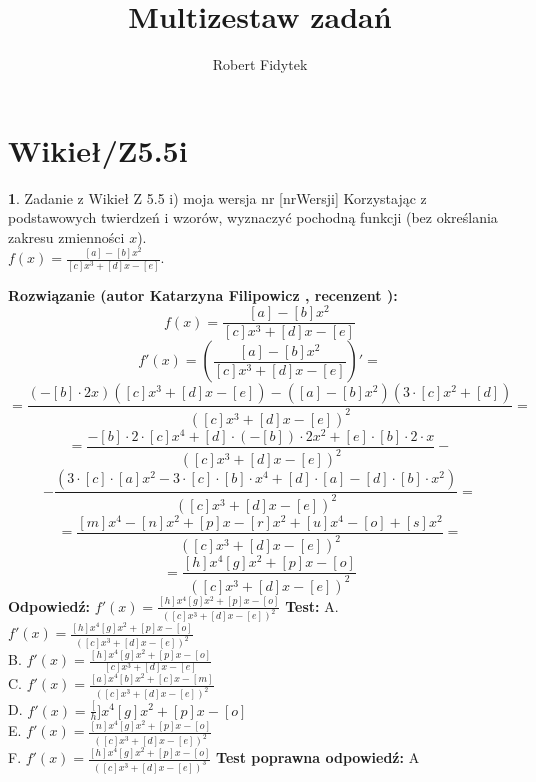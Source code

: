\documentclass[12pt, a4paper]{article}
\title{Multizestaw zadań}
\author{Robert Fidytek}
\date{}
\theoremstyle{definition} %
\newtheorem{zad}{}
\newcommand{\kategoria}[1]{\section{#1}} %
\newcommand{\zadStart}[1]{\begin{zad}#1\newline} %
\newcommand{\zadStop}{\end{zad}}   %
\newcommand{\rozwStart}[2]{\noindent \textbf{Rozwiązanie (autor #1 , recenzent #2): }\newline} %
\newcommand{\rozwStop}{\newline}                                            %
\newcommand{\odpStart}{\noindent \textbf{Odpowiedź:}\newline}    %
\newcommand{\odpStop}{\newline}                                             %
\newcommand{\testStart}{\noindent \textbf{Test:}\newline} %
\newcommand{\testStop}{\newline} %
\newcommand{\kluczStart}{\noindent \textbf{Test poprawna odpowiedź:}\newline} %
\newcommand{\kluczStop}{\newline} %
\begin{document}
\maketitle


\kategoria{Wikieł/Z5.5i}
\zadStart{Zadanie z Wikieł Z 5.5 i) moja wersja nr [nrWersji]}
Korzystając z podstawowych twierdzeń i wzorów, wyznaczyć pochodną funkcji (bez określania zakresu zmienności $x$).\\ $f(x)=\frac{[a]-[b]x^2}{[c]x^3+[d]x-[e]}$.
\zadStop
\rozwStart{Katarzyna Filipowicz}{}
$$f(x)=\frac{[a]-[b]x^2}{[c]x^3+[d]x-[e]}$$
$$f'(x)=\left(\frac{[a]-[b]x^2}{[c]x^3+[d]x-[e]}\right)' = $$
$$ = \frac{\left(-[b]\cdot 2x\right)([c]x^3+[d]x-[e])- \left([a]-[b]x^2\right) (3\cdot [c]x^2+[d])}{([c]x^3+[d]x-[e])^2} = $$
$$
=\frac{-[b]\cdot 2 \cdot [c]x^4+[d]\cdot(-[b])\cdot 2 x^2+[e]\cdot [b]\cdot 2 \cdot x}{([c]x^3+[d]x-[e])^2}-
$$ $$
-\frac{(3\cdot [c]\cdot [a]x^2-3\cdot [c]\cdot[b]\cdot  x^4+[d]\cdot[a]-[d]\cdot [b] \cdot x^2) }{([c]x^3+[d]x-[e])^2}=
$$ $$
=\frac{[m]x^4-[n]x^2+[p]x-[r]x^2+[u]x^4-[o]+[s]x^2 }{([c]x^3+[d]x-[e])^2}=
$$ $$
=\frac{[h]x^4 [g]x^2+[p]x-[o]}{([c]x^3+[d]x-[e])^2}
$$
\rozwStop
\odpStart
$ f'(x)=\frac{[h]x^4 [g]x^2+[p]x-[o]}{([c]x^3+[d]x-[e])^2}$
\odpStop
\testStart
A. $ f'(x)=\frac{[h]x^4 [g]x^2+[p]x-[o]}{([c]x^3+[d]x-[e])^2}$\\
B. $ f'(x)=\frac{[h]x^4 [g]x^2+[p]x-[o]}{[c]x^3+[d]x-[e]}$\\
C. $ f'(x)=\frac{[a]x^4 [b]x^2+[c]x-[m]}{([c]x^3+[d]x-[e])^2}$ \\
D. $ f'(x)=\frac[h]x^4 [g]x^2+[p]x-[o]$\\
E. $ f'(x)=\frac{[n]x^4 [g]x^2+[p]x-[o]}{([c]x^3+[d]x-[e])^2}$\\
F. $ f'(x)=\frac{[h]x^4 [g]x^2+[p]x-[o]}{([c]x^3+[d]x-[e])^3}$
\testStop
\kluczStart
A
\kluczStop
\end{document}
